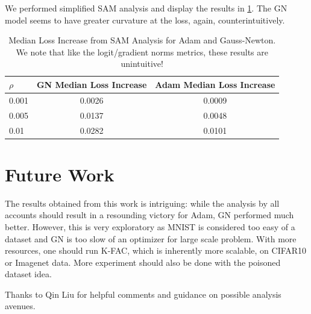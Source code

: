 \documentclass{article}
\begin{document}
    We performed simplified SAM analysis and display the results in \cref{tab:sam_results}.
    The GN model seems to have greater curvature at the loss, again, counterintuitively.


    \begin{table}[ht!]
        \centering
        \caption{Median Loss Increase from SAM Analysis for Adam and Gauss-Newton.
        We note that like the logit/gradient norms metrics, these results are unintuitive!}
        \label{tab:sam_results}
        \begin{tabular}{|l|c|c|}
            \hline
            \textbf{$\rho$} & \textbf{GN Median Loss Increase} & \textbf{Adam Median Loss Increase} \\
            \hline
            0.001 & 0.0026 & 0.0009\\
            \hline
            0.005 & 0.0137 & 0.0048 \\
            \hline
            0.01 & 0.0282 & 0.0101  \\
            \hline
        \end{tabular}
    \end{table}

    \section{Future Work}
    The results obtained from this work is intriguing: while the analysis by all accounts should result in a resounding victory for Adam, GN performed much better.
    However, this is very exploratory as MNIST is considered too easy of a dataset and GN is too slow of an optimizer for large scale problem.
    With more resources, one should run K-FAC, which is inherently more scalable, on CIFAR10 or Imagenet data.
    More experiment should also be done with the poisoned dataset idea.

    \begin{ack}
        Thanks to Qin Liu for helpful comments and guidance on possible analysis avenues.
    \end{ack}
    
    
\end{document}
